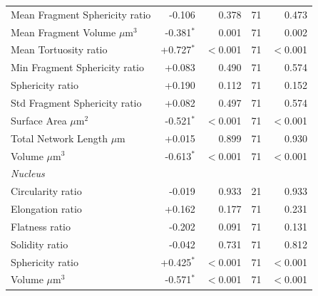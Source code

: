 \documentclass[11pt,a4paper]{article}
\begin{document}
\begin{longtable}{lrrrr}
  Mean Fragment Sphericity ratio & -0.106 & 0.378 & 71 & 0.473 \\
  Mean Fragment Volume $\mu$m$^{3}$ & -0.381$^{*}$ & 0.001 & 71 & 0.002 \\
  Mean Tortuosity ratio & +0.727$^{*}$ & $<$0.001 & 71 & $<$0.001 \\
  Min Fragment Sphericity ratio & +0.083 & 0.490 & 71 & 0.574 \\
  Sphericity ratio & +0.190 & 0.112 & 71 & 0.152 \\
  Std Fragment Sphericity ratio & +0.082 & 0.497 & 71 & 0.574 \\
  Surface Area $\mu$m$^{2}$ & -0.521$^{*}$ & $<$0.001 & 71 & $<$0.001 \\
  Total Network Length $\mu$m & +0.015 & 0.899 & 71 & 0.930 \\
  Volume $\mu$m$^{3}$ & -0.613$^{*}$ & $<$0.001 & 71 & $<$0.001 \\
\midrule
\multicolumn{5}{l}{\textit{Nucleus}} \\
  Circularity ratio & -0.019 & 0.933 & 21 & 0.933 \\
  Elongation ratio & +0.162 & 0.177 & 71 & 0.231 \\
  Flatness ratio & -0.202 & 0.091 & 71 & 0.131 \\
  Solidity ratio & -0.042 & 0.731 & 71 & 0.812 \\
  Sphericity ratio & +0.425$^{*}$ & $<$0.001 & 71 & $<$0.001 \\
  Volume $\mu$m$^{3}$ & -0.571$^{*}$ & $<$0.001 & 71 & $<$0.001 \\
\bottomrule
\end{longtable}
\end{document}
